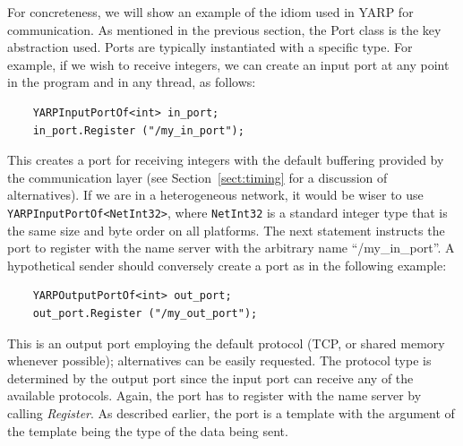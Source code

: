 \label{sect:code}

For concreteness, we will show an example of the idiom used in YARP
for communication.  As mentioned in the previous section, the Port class is the
key abstraction used. 
Ports are typically instantiated with a specific type.  For example, if we
wish to receive integers, we can create an input port at any point
in the program and in any thread, as follows:
%
\begin{verbatim}
    YARPInputPortOf<int> in_port;
    in_port.Register ("/my_in_port");
\end{verbatim}
%
\noindent This creates a port for receiving integers with the default
buffering provided by the communication layer (see
Section~\ref{sect:timing} for a discussion of alternatives).  If we
are in a heterogeneous network, it would be wiser to use {\tt
YARPInputPortOf<NetInt32>}, where {\tt NetInt32} is a standard integer
type that is the same size and byte order on all platforms.  The next
statement instructs the port to register with the name server with the
arbitrary name ``/my\_in\_port''. A hypothetical sender should conversely
create a port as in the following example:
%
\begin{verbatim}
    YARPOutputPortOf<int> out_port;
    out_port.Register ("/my_out_port");
\end{verbatim}
%
\noindent This is an output port employing the default protocol (TCP, or shared memory whenever
possible); alternatives can be easily requested.  The protocol type
is determined by the output port since the input port can receive any of the available
protocols. Again, the port has to register with the name server by calling 
{\em Register}. As described earlier, the port is a template with the argument of the
template being the type of the data being sent.

